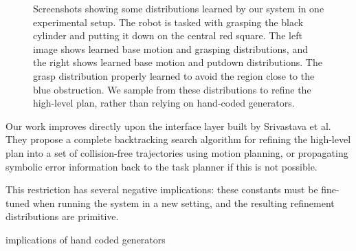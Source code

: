 \begin{figure}[h]
  \caption{Screenshots showing some distributions learned by our system in one experimental
    setup. The robot is tasked with grasping the black cylinder and putting it down on the
    central red square. The left image shows learned base motion and grasping distributions,
    and the right shows learned base motion and putdown distributions. The grasp distribution
    properly learned to avoid the region close to the blue obstruction. We sample from these distributions
    to refine the high-level plan, rather than relying on hand-coded generators.}
  \label{fig:cover}
\end{figure}

Our work improves directly upon the interface layer built
by Srivastava et al. They propose a complete backtracking search algorithm for refining
the high-level plan into a set of collision-free trajectories using motion planning, or
propagating symbolic error information back to the task planner if this is not possible.

This restriction has several negative implications: these
constants must be fine-tuned when running the system in a new setting, and the
resulting refinement distributions are primitive.

implications of hand coded generators